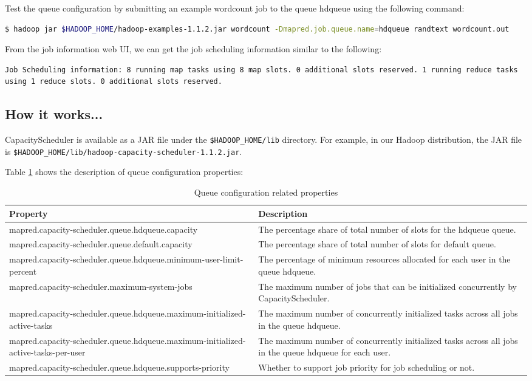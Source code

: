 Test the queue configuration by submitting an example wordcount job to the queue hdqueue using the following command: 
\lstset{style=bashstyle}
\begin{lstlisting}[language=bash]
$ hadoop jar $HADOOP_HOME/hadoop-examples-1.1.2.jar wordcount -Dmapred.job.queue.name=hdqueue randtext wordcount.out
\end{lstlisting}

From the job information web UI, we can get the job scheduling information similar to the following: 
\lstset{style=bashstyle}
\begin{lstlisting}
Job Scheduling information: 8 running map tasks using 8 map slots. 0 additional slots reserved. 1 running reduce tasks using 1 reduce slots. 0 additional slots reserved.
\end{lstlisting}

\subsection*{How it works...}
CapacityScheduler is available as a JAR file under the \verb|$HADOOP_HOME/lib| directory. For example, in our Hadoop distribution, the JAR file is \verb|$HADOOP_HOME/lib/hadoop-capacity-scheduler-1.1.2.jar|.

Table \ref{tbl:queueconfig} shows the description of queue configuration properties: 
\begin{table}[ht]
  \footnotesize
  \centering
  \begin{tabular}{p{}p{}}
    \toprule 
    \textbf{Property} & \textbf{Description} \\ \midrule
    mapred.capacity-scheduler.queue.hdqueue.capacity & The percentage share of total number of slots for the hdqueue queue. \\
    mapred.capacity-scheduler.queue.default.capacity & The percentage share of total number of slots for default queue.\\
    mapred.capacity-scheduler.queue.hdqueue.minimum-user-limit-percent & The percentage of minimum resources allocated for each user in the queue hdqueue. \\
    mapred.capacity-scheduler.maximum-system-jobs & The maximum number of jobs that can be initialized concurrently by CapacityScheduler. \\
    mapred.capacity-scheduler.queue.hdqueue.maximum-initialized-active-tasks & The maximum number of concurrently initialized tasks across all jobs in the queue hdqueue. \\
    mapred.capacity-scheduler.queue.hdqueue.maximum-initialized-active-tasks-per-user & The maximum number of concurrently initialized tasks across all jobs in the queue hdqueue for each user. \\
    mapred.capacity-scheduler.queue.hdqueue.supports-priority & Whether to support job priority for job scheduling or not. \\ \bottomrule
  \end{tabular}
  \caption{Queue configuration related properties}\label{tbl:queueconfig}
\end{table}

